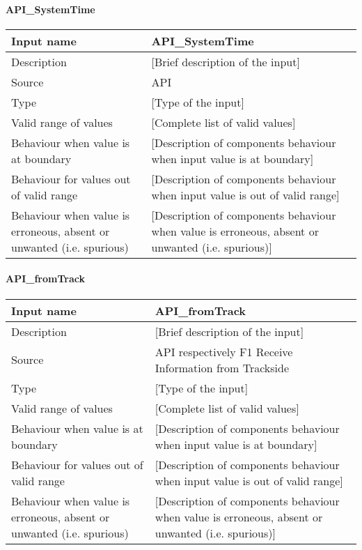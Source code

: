 \paragraph{API\_SystemTime}

\begin{longtable}{p{}p{}}
\toprule
Input name				& API\_SystemTime \\
\midrule
Description				& [Brief description of the input] \\
\midrule
Source					& API \\ 
\midrule
Type					& [Type of the input] \\
\midrule
Valid range of values	& [Complete list of valid values] \\
\midrule
Behaviour when value is at boundary	& [Description of components behaviour when input value is at boundary] \\
\midrule
Behaviour for values out of valid range	& [Description of components behaviour when input value is out of valid range] \\
\midrule
Behaviour when value is erroneous, absent or unwanted (i.e. spurious) & [Description of components behaviour when value is erroneous, absent or unwanted (i.e. spurious)] \\
\bottomrule
\end{longtable}

\paragraph{API\_fromTrack}

\begin{longtable}{p{}p{}}
\toprule
Input name				& API\_fromTrack \\
\midrule
Description				& [Brief description of the input] \\
\midrule
Source					& API respectively F1 Receive Information from Trackside\\ 
\midrule
Type					& [Type of the input] \\
\midrule
Valid range of values	& [Complete list of valid values] \\
\midrule
Behaviour when value is at boundary	& [Description of components behaviour when input value is at boundary] \\
\midrule
Behaviour for values out of valid range	& [Description of components behaviour when input value is out of valid range] \\
\midrule
Behaviour when value is erroneous, absent or unwanted (i.e. spurious) & [Description of components behaviour when value is erroneous, absent or unwanted (i.e. spurious)] \\
\bottomrule
\end{longtable}

